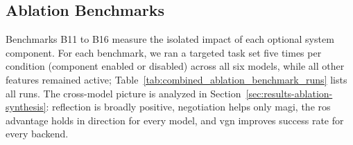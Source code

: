 \documentclass[
     12pt,
     a4paper,
     BCOR=10mm,
     DIV=14,
     listof=totoc,
     bibliography=totoc,
     parskip,
     twoside,
     headsepline
     ]{scrreprt}
\begin{document}
\subsection{Ablation Benchmarks}
Benchmarks B11 to B16 measure the isolated impact of each optional system component. For each benchmark, we ran a targeted task set five times per condition (component enabled or disabled) across all six models, while all other features remained active; Table~\ref{tab:combined_ablation_benchmark_runs} lists all runs. The cross-model picture is analyzed in Section~\ref{sec:results-ablation-synthesis}: reflection is broadly positive, negotiation helps only \gls{magi}, the \gls{ros} advantage holds in direction for every model, and \gls{vgn} improves success rate for every backend.

\begingroup
\footnotesize
\setlength{\tabcolsep}{3pt}
\setlength{\extrarowheight}{0pt}
\renewcommand{\arraystretch}{1.0}
\convertXColumns
\end{document}
